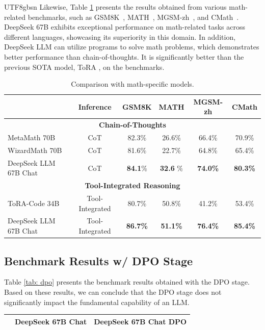 \documentclass[11pt, a4paper, logo, copyright, nonumbering]{deepseek}
\begin{document}
\begin{CJK*}{UTF8}{gbsn}
Likewise, Table \ref{table:math_results} presents the results obtained from various math-related benchmarks, such as GSM8K~\citep{gsm8k}, MATH~\citep{hendrycks2021measuring}, MGSM-zh~\citep{mgsm}, and CMath~\citep{wei2023cmath}. DeepSeek 67B exhibits exceptional performance on math-related tasks across different languages, showcasing its superiority in this domain. In addition, DeepSeek LLM can utilize programs to solve math problems, which demonstrates better performance than chain-of-thoughts. It is significantly better than the previous SOTA model, ToRA \citep{tora}, on the benchmarks. 

\begin{table}[h]
\centering
\small
\begin{tabular}{lccccc}
\toprule
&\textbf{Inference} & \textbf{GSM8K} & \textbf{MATH} & \textbf{MGSM-zh} & \textbf{CMath} \\
         \midrule
            \multicolumn{6}{c}{\bf{Chain-of-Thoughts}} \\
            \midrule
MetaMath 70B \citep{metamath} & CoT & 82.3\% & 26.6\% & 66.4\% & 70.9\% \\ 
WizardMath 70B \citep{wizardmath} & CoT  & 81.6\% & 22.7\% & 64.8\% & 65.4\% \\ 
DeepSeek LLM 67B Chat &CoT                & \textbf{84.1}\%         & \textbf{32.6} \%        & \textbf{74.0\%}           & \textbf{80.3\%}                    \\ 
            \midrule
            \multicolumn{6}{c}{\bf{Tool-Integrated Reasoning}} \\
            \midrule
ToRA-Code 34B \citep{tora} & Tool-Integrated & 80.7\% & 50.8\% & 41.2\% & 53.4\% \\ 
DeepSeek LLM 67B Chat  & Tool-Integrated & \textbf{86.7\%} & \textbf{51.1\%}        & \textbf{76.4\%}           & \textbf{85.4\%}                  \\ \bottomrule
\end{tabular}
\caption{\centering Comparison with math-specific models. \label{table:math_results}}

\end{table}

\subsection{Benchmark Results w/ DPO Stage}
Table \ref{tab: dpo} presents the benchmark results obtained with the DPO stage. Based on these results, we can conclude that the DPO stage does not significantly impact the fundamental capability of an LLM.
\begin{table}[h]
    \centering \small
\begin{tabular}{lcc}
\toprule
& DeepSeek 67B Chat & DeepSeek 67B Chat DPO \\ \midrule


\end{tabular}
\end{table}
\end{CJK*}
\end{document}
